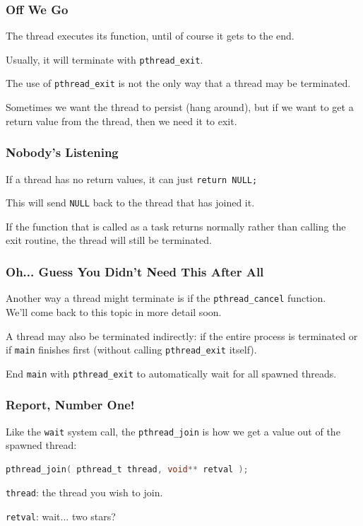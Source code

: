 \begin{frame}
	\frametitle{Off We Go}

	The thread executes its function, until of course it gets to the end.

	Usually, it will terminate with \texttt{pthread\_exit}.

	The use of \texttt{pthread\_exit} is not the only way that a thread may be terminated.

	Sometimes we want the thread to persist (hang around), but if we want to get a return value from the thread, then we need it to exit.

\end{frame}


\begin{frame}
	\frametitle{Nobody's Listening}

	If a thread has no return values, it can just \texttt{return NULL;}

	This will send \texttt{NULL} back to the thread that has joined it.

	If the function that is called as a task returns normally rather than calling the exit routine, the thread will still be terminated.

\end{frame}

\begin{frame}
	\frametitle{Oh... Guess You Didn't Need This After All}

	Another way a thread might terminate is if the \texttt{pthread\_cancel} function.\\
	\quad We'll come back to this topic in more detail soon.

	A thread may also be terminated indirectly: if the entire process is terminated or if \texttt{main} finishes first (without calling \texttt{pthread\_exit} itself).

	End \texttt{main} with \texttt{pthread\_exit} to automatically wait for all spawned threads.

\end{frame}


\begin{frame}[fragile]
	\frametitle{Report, Number One!}

	Like the \texttt{wait} system call, the \texttt{pthread\_join} is how we get a value out of the spawned thread:

	\begin{lstlisting}[language=C]
pthread_join( pthread_t thread, void** retval );
\end{lstlisting}

	\texttt{thread}: the thread you wish to join.

	\texttt{retval}: wait... two stars?

\end{frame}

